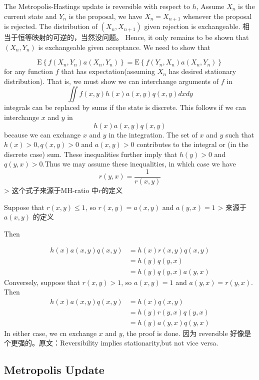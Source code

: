 \documentclass[
]{book}
\theoremstyle{definition}
\theoremstyle{definition}
\theoremstyle{definition}
\theoremstyle{remark}
\begin{document}
The Metropolis-Hastings update is reversible with respect to \(h\),
Assume \(X_n\) is the current state and \(Y_n\) is the proposal, we have \(X_n=X_{n+1}\) whenever the proposal is rejected. The distribution of \((X_n,X_{n+1})\) given rejection is exchangeable. 相当于恒等映射的可逆的，当然没问题。
Hence, it only remains to be shown that \((X_n,Y_n)\) is exchangeable given acceptance. We need to show that

\[
\mathrm{E}\left\{f\left(X_{n}, Y_{n}\right) a\left(X_{n}, Y_{n}\right)\right\}=\mathrm{E}\left\{f\left(Y_{n}, X_{n}\right) a\left(X_{n}, Y_{n}\right)\right\}
\]
for any function \(f\) that has expectation(assuming \(X_n\) has desired stationary distribution). That is, we must show we can interchange arguments of \(f\) in
\[
\iint f(x, y) h(x) a(x, y) q(x, y) d x d y
\]
integrals can be replaced by sums if the state is discrete. This follows if we can interchange \(x\) and \(y\) in
\[
h(x) a(x, y) q(x, y)
\]
because we can exchange \(x\) and \(y\) in the integration. The set of \(x\) and \(y\) such that \(h(x)>0,q(x,y)>0\) and \(a(x,y)>0\) contributes to the integral or (in the discrete case) sum. These inequalities further imply that \(h(y)>0\) and \(q(y,x)>0\).Thus we may assume these inequalities, in which case we have
\[
r(y, x)=\frac{1}{r(x, y)}
\]
\textgreater{} 这个式子来源于MH-ratio 中\(r\)的定义

Suppose that \(r(x,y)\leq 1\), so \(r(x,y)=a(x,y)\) and \(a(y,x)=1\)
\textgreater{} 来源于\(a(x,y)\) 的定义

Then

\[
\begin{aligned} h(x) a(x, y) q(x, y) &=h(x) r(x, y) q(x, y) \\ &=h(y) q(y, x) \\ &=h(y) q(y, x) a(y, x) \end{aligned}
\]
Conversely, suppose that \(r(x,y)>1\), so \(a(x,y)=1\) and \(a(y,x)=r(y,x)\). Then
\[
\begin{aligned} h(x) a(x, y) q(x, y) &=h(x) q(x, y) \\ &=h(y) r(y, x) q(y, x) \\ &=h(y) a(y, x) q(y, x) \end{aligned}
\]
In either case, we cn exchange \(x\) and \(y\), the proof is done. 因为 reversible 好像是个更强的。原文：Reversibility implies stationarity,but not vice versa.

\hypertarget{metropolis-update}{%
\subsection{Metropolis Update}\label{metropolis-update}}
\end{document}
